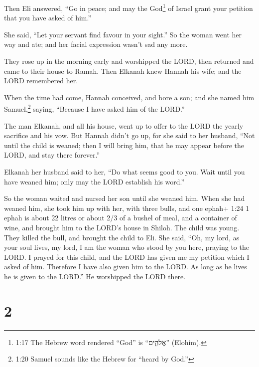  Then Eli answered, ``Go in peace; and may the
God\footnote{1:17 The Hebrew word rendered ``God'' is ``אֱלֹהִ֑ים''
  (Elohim).} of Israel grant your petition that you have asked of him.''

 She said, ``Let your servant find favour in your sight.''
So the woman went her way and ate; and her facial expression wasn't sad
any more.

 They rose up in the morning early and worshipped the LORD,
then returned and came to their house to Ramah. Then Elkanah knew Hannah
his wife; and the LORD remembered her.

 When the time had come, Hannah conceived, and bore a son;
and she named him Samuel,\footnote{1:20 Samuel sounds like the Hebrew
  for ``heard by God.''} saying, ``Because I have asked him of the
LORD.''

 The man Elkanah, and all his house, went up to offer to
the LORD the yearly sacrifice and his vow.  But Hannah
didn't go up, for she said to her husband, ``Not until the child is
weaned; then I will bring him, that he may appear before the LORD, and
stay there forever.''

 Elkanah her husband said to her, ``Do what seems good to
you. Wait until you have weaned him; only may the LORD establish his
word.''

So the woman waited and nursed her son until she weaned him.
 When she had weaned him, she took him up with her, with
three bulls, and one ephah+ 1:24 1 ephah is about 22 litres or about 2/3
of a bushel of meal, and a container of wine, and brought him to the
LORD's house in Shiloh. The child was young.  They killed
the bull, and brought the child to Eli.  She said, ``Oh, my
lord, as your soul lives, my lord, I am the woman who stood by you here,
praying to the LORD.  I prayed for this child, and the LORD
has given me my petition which I asked of him.  Therefore I
have also given him to the LORD. As long as he lives he is given to the
LORD.'' He worshipped the LORD there.

\hypertarget{section-1}{%
\section{2}\label{section-1}}

